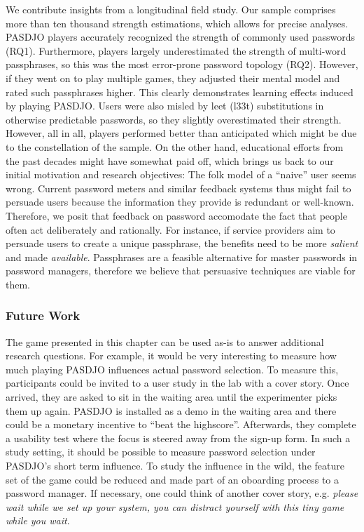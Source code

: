 We contribute insights from a longitudinal field study. Our sample comprises more than ten thousand strength estimations, which allows for precise analyses. PASDJO players accurately recognized the strength of commonly used passwords (RQ1). Furthermore, players largely underestimated the strength of multi-word passphrases, so this was the most error-prone password topology (RQ2). However, if they went on to play multiple games, they adjusted their mental model and rated such passphrases higher. This clearly demonstrates learning effects induced by playing PASDJO. Users were also misled by leet (l33t) substitutions in otherwise predictable passwords, so they slightly overestimated their strength. However, all in all, players performed better than anticipated which might be due to the constellation of the sample. On the other hand, educational efforts from the past decades might have somewhat paid off, which brings us back to our initial motivation and research objectives: The folk model of a ``naive'' user seems wrong. Current password meters and similar feedback systems thus might fail to persuade users because the information they provide is redundant or well-known. Therefore, we posit that feedback on password accomodate the fact that people often act deliberately and rationally. For instance, if service providers aim to persuade users to create a unique passphrase, the benefits need to be more \textit{salient} and made \textit{available}. Passphrases are a feasible alternative for master passwords in password managers, therefore we believe that persuasive techniques are viable for them. 

\subsubsection{Future Work}
The game presented in this chapter can be used as-is to answer additional research questions. For example, it would be very interesting to measure how much playing PASDJO influences actual password selection. To measure this, participants could be invited to a user study in the lab with a cover story. Once arrived, they are asked to sit in the waiting area until the experimenter picks them up again. PASDJO is installed as a demo in the waiting area and there could be a monetary incentive to ``beat the highscore''. Afterwards, they complete a usability test where the focus is steered away from the sign-up form. In such a study setting, it should be possible to measure password selection under PASDJO's short term influence. To study the influence in the wild, the feature set of the game could be reduced and made part of an oboarding process to a password manager. If necessary, one could think of another cover story, e.g. \textit{please wait while we set up your system, you can distract yourself with this tiny game while you wait}.

